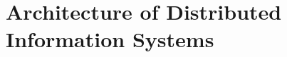 \documentclass[ieeetran]{article}
\begin{document}
\pagebreak
\section{Architecture of Distributed Information Systems} %
\label{sec:architecture_of_distributed_information_systems}




























































\end{document}
